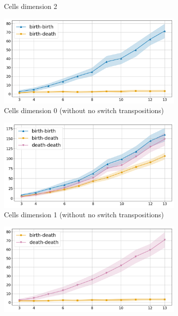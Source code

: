 \documentclass{article}
\begin{document}
\begin{figure}[htbp]
\begin{subfigure}[b]{0.3\textwidth}
    \caption{Cells dimension 2}
    \label{fig:complex2cells2}
\end{subfigure}
\vspace{0.5cm}
\begin{subfigure}[b]{0.3\textwidth}
    \includegraphics[width=\linewidth]{pics/torus-transpositions-extended/transposition-types-complex-dim2-subposet-dim0-drop-no-switches-True.png}
    \caption{Cells dimension 0 (without no switch transpositions)}
    \label{fig:complex2cells0onlyswitch}
\end{subfigure}
\hfill
\begin{subfigure}[b]{0.3\textwidth}
    \includegraphics[width=\linewidth]{pics/torus-transpositions-extended/transposition-types-complex-dim2-subposet-dim1-drop-no-switches-True.png}
    \caption{Cells dimension 1 (without no switch transpositions)}
    \label{fig:complex2cells1onlyswitch}
\end{subfigure}
\hfill
\begin{subfigure}[b]{0.3\textwidth}
    \includegraphics[width=\linewidth]{pics/torus-transpositions-extended/transposition-types-complex-dim2-subposet-dim2-drop-no-switches-True.png}

\end{subfigure}
\end{figure}
\end{document}
